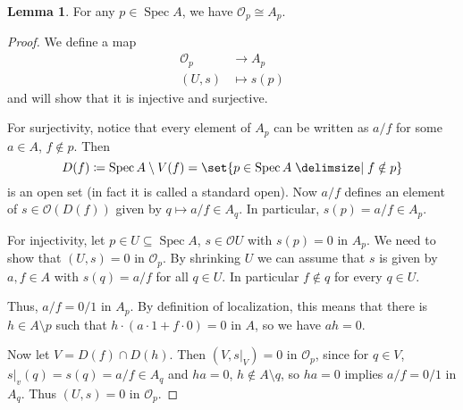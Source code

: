 \documentclass[a4paper]{amsbook}
\theoremstyle{definition}
\newtheorem*{lemma*}{Lemma}
\DeclareMathOperator\Spec{Spec}
\begin{document}
\begin{lemma*}
\label{StructureSheafStalk}
For any $p \in \Spec A$, we have $\mathcal{O}_p\cong A_p$.
\end{lemma*}
\begin{proof}[Proof]
We define a map
\begin{align*}
	\mathcal{O}_p&\to A_p\\
	(U, s)&\mapsto s(p)
\end{align*}
and will show that it is injective and surjective.

For surjectivity, notice that every element of $A_p$ can be written as
$a/f$ for some $a \in A$, $f \notin p$. Then
\[ D(f)\coloneqq \Spec A\setminus V(f) = \set{p \in \Spec A\given f\notin p} \]
is an open set (in fact it is called a standard open). Now $a/f$ defines an
element of $s \in \mathcal{O}(D(f))$ given by $q\mapsto a/f \in A_q$.
In particular, $s(p) = a/f \in A_p$.

For injectivity, let $p \in U \subseteq \Spec A$, $s \in \mathcal{O}U$ with $s(p) = 0$ in
$A_p$. We need to show that $(U, s) = 0$ in $\mathcal{O}_p$. By shrinking $U$
we can assume that $s$ is given by $a, f \in A$ with $s(q) = a/f$ for all $q \in U$.
In particular $f\notin q$ for every $q \in U$.

Thus, $a/f = 0/1$ in $A_p$. By definition of localization, this means that there
is $h \in A\setminus p$ such that  $h\cdot(a\cdot 1 + f\cdot 0) = 0$ in $A$,
so we have $ah = 0$.

Now let $V = D(f)\cap D(h)$. Then $(V, s|_V) = 0$ in $\mathcal{O}_p$, since
for $q \in V$, $s|_v(q) = s(q) = a/f \in A_q$ and $ha = 0$, $h \notin A\setminus q$,
so $ha = 0$ implies $a/f = 0/1$ in $A_q$. Thus $(U, s) = 0$ in $\mathcal{O}_p$.
\end{proof}
\end{document}
